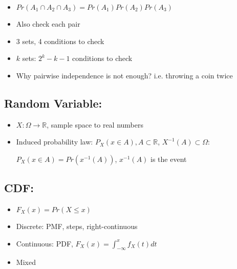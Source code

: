 \documentclass[11pt,letterpaper,titlepage]{article}
\begin{document}
\begin{itemize}

    \item $Pr(A_1 \cap A_2 \cap A_3) = Pr(A_1)Pr(A_2)Pr(A_3)$
    
    \item Also check each pair
    
    \item 3 sets, 4 conditions to check
    
    \item $k$ sets: $2^k - k -1$ conditions to check
    
    \item Why pairwise independence is not enough? i.e. throwing a coin twice
    
\end{itemize}

\subsection{Random Variable:}

\begin{itemize}

    \item $X: \Omega \rightarrow \mathbb{R}$, sample space to real numbers
    
    \item Induced probability law: $P_X(x \in A), A \subset \mathbb{R}$, $X^{-1} (A) \subset \Omega$:
    
    $P_X(x \in A) = Pr(x^{-1} (A))$, $x^{-1} (A)$ is the event
    
\end{itemize}

\subsection{CDF:}

\begin{itemize}

    \item $F_X (x) = Pr(X \leq x)$
    
    \item Discrete: PMF, steps, right-continuous
    
    \item Continuous: PDF, $F_X (x) = \int_{-\infty}^{x} f_X(t)dt$
    
    \item Mixed
    
\end{itemize}
\end{document}

